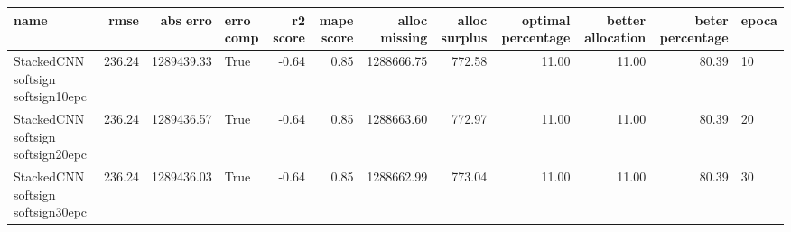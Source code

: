 \begin{tabular}{lrrlrrrrrrrl}
\toprule
name & rmse & abs erro & erro comp & r2 score & mape score & alloc missing & alloc surplus & optimal percentage & better allocation & beter percentage & epoca \\
\midrule
StackedCNN softsign softsign10epc & 236.24 & 1289439.33 & True & -0.64 & 0.85 & 1288666.75 & 772.58 & 11.00 & 11.00 & 80.39 & 10 \\
StackedCNN softsign softsign20epc & 236.24 & 1289436.57 & True & -0.64 & 0.85 & 1288663.60 & 772.97 & 11.00 & 11.00 & 80.39 & 20 \\
StackedCNN softsign softsign30epc & 236.24 & 1289436.03 & True & -0.64 & 0.85 & 1288662.99 & 773.04 & 11.00 & 11.00 & 80.39 & 30 \\
\bottomrule
\end{tabular}
